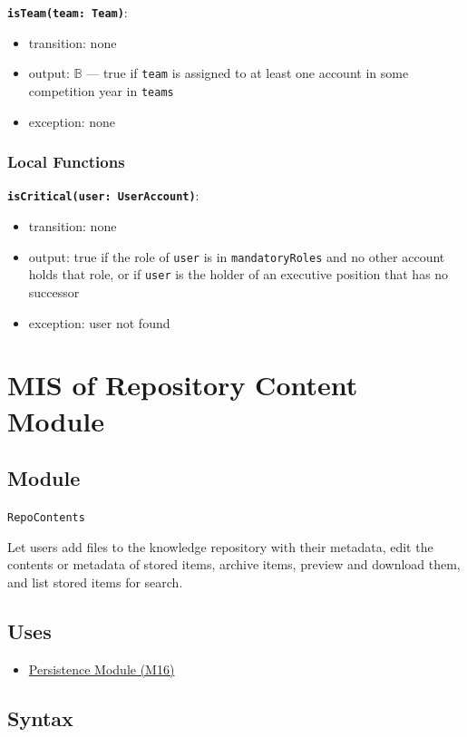 \documentclass[12pt, titlepage]{article}
\begin{document}
\textbf{\texttt{isTeam(team: Team)}}:
\begin{itemize}
  \item transition: none
  \item output: $\mathbb{B}$ --- true if \texttt{team} is assigned to at least one account in some competition year in \texttt{teams}
  \item exception: none
\end{itemize}

\subsubsection{Local Functions}

\textbf{\texttt{isCritical(user: UserAccount)}}:
\begin{itemize}
  \item transition: none
  \item output: true if the role of \texttt{user} is in \texttt{mandatoryRoles} and no other account holds that role, or if \texttt{user} is the holder of an executive position that has no successor
  \item exception: user not found
\end{itemize}

\newpage

\section{MIS of Repository Content Module} \label{mContent}

\subsection{Module}
\texttt{RepoContents}

Let users add files to the knowledge repository with their metadata, edit the contents or metadata of stored items, archive items, preview and download them, and list stored items for search.

\subsection{Uses}
\begin{itemize}
  \item \hyperref[mPersist]{Persistence Module (M16)}
\end{itemize}

\subsection{Syntax}
\end{document}
